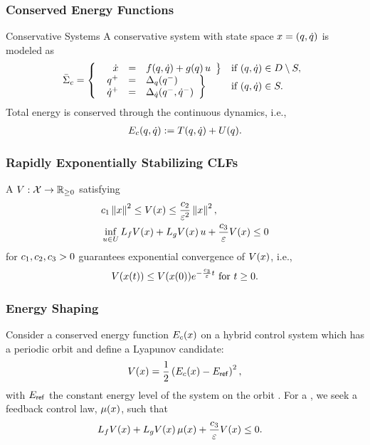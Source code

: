 \begin{frame}[t]
  \frametitle{Conserved Energy Functions}
  \begin{block}{Conservative Systems}
    A conservative system with state space $x = (q, \dot q)$ is modeled as
    \begin{align*}
      \bar{\Sigma}_{c} = \left\{
      \begin{array}{l l}
        \left.\begin{array}{r c l}
          \hspace{.58em}\dot{x} &=& f(q, \dot q) + g(q) \, u
        \end{array}\right\}  & \mbox{if } (q, \dot q) \in D \setminus S,\\
        \left. \begin{array}{r c l}
          q^{+} &=& \Delta_{q}(q^{-})\\
          \dot q^{+} &=& \Delta_{\dot q}(q^{-}, \dot q^{-})
        \end{array} \right\} & \mbox{if } (q, \dot q) \in S.
      \end{array}\right.
    \end{align*}
    Total energy is conserved through the continuous dynamics, i.e.,
    \begin{align*}
      E_{c}(q, \dot q) := T(q, \dot q) + U(q).
    \end{align*}
  \end{block}
\end{frame}

\begin{frame}[t]
  \frametitle{Rapidly Exponentially Stabilizing CLFs}
  A 
  $V : \mathcal{X} \to \mathbb{R}_{\geq 0}$ satisfying
  \begin{align*}
    &c_{1} \left\|x\right\|^{2} \leq V(x) \leq \frac{c_{2}}{\varepsilon^{2}} \left\|x\right\|^{2},\\
    &\inf_{u \in U} L_{f}V(x) + L_{g}V(x) \, u +
    \frac{c_{3}}{\varepsilon} V(x) \leq 0
  \end{align*}
  for $c_{1}, c_{2}, c_{3} > 0$ guarantees exponential convergence of $V(x)$, i.e.,
  \begin{align*}
    V(x(t)) \leq V(x(0)) e^{-\frac{c_{3}}{\varepsilon} t} \mbox{ for } t \geq 0.
  \end{align*}
\end{frame}

\begin{frame}[t]
  \frametitle{Energy Shaping}
  Consider a conserved energy function $E_{c}(x)$ on a hybrid control system
  \HCSbar which has a periodic orbit \orbit and define a Lyapunov candidate:
  \begin{align*}
    V(x) = \frac{1}{2} \left(E_{c}(x) - E_{\mathsf{ref}}\right)^{2},
  \end{align*}
  with $E_{\mathsf{ref}}$ the constant energy level of the system on the orbit
  \orbit. For a \RESCLF, we seek a feedback control law, $\mu(x)$, such that
  \begin{align*}
    L_{f} V(x) + L_{g} V(x) \, \mu(x) + \frac{c_{3}}{\varepsilon} V(x) &\leq 0.
  \end{align*}
\end{frame}

